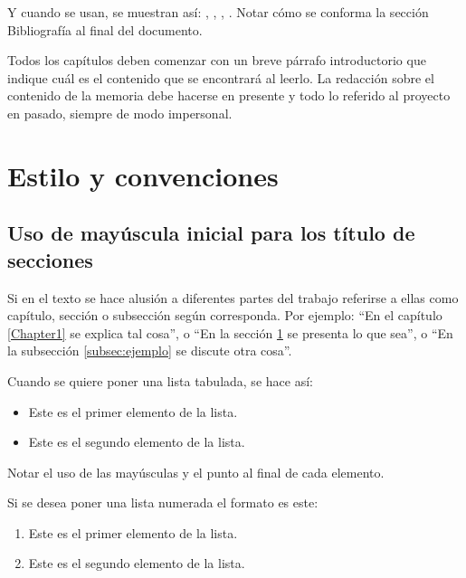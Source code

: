 Y cuando se usan, se muestran así: \citep{ARTICLE:1}, \citep{BOOK:1}, \citep{BOOK:2}, \citep{WEBSITE:1}.  Notar cómo se conforma la sección Bibliografía al final del documento. 



Todos los capítulos deben comenzar con un breve párrafo introductorio que indique cuál es el contenido que se encontrará al leerlo.  La redacción sobre el contenido de la memoria debe hacerse en presente y todo lo referido al proyecto en pasado, siempre de modo impersonal.

\section{Estilo y convenciones}
\label{sec:ejemplo}

\subsection{Uso de mayúscula inicial para los título de secciones}

Si en el texto se hace alusión a diferentes partes del trabajo referirse a ellas como capítulo, sección o subsección según corresponda. Por ejemplo: ``En el capítulo \ref{Chapter1} se explica tal cosa'', o ``En la sección \ref{sec:ejemplo} se presenta lo que sea'', o ``En la subsección \ref{subsec:ejemplo} se discute otra cosa''.

Cuando se quiere poner una lista tabulada, se hace así:

\begin{itemize}
	\item Este es el primer elemento de la lista.
	\item Este es el segundo elemento de la lista.
\end{itemize}

Notar el uso de las mayúsculas y el punto al final de cada elemento.

Si se desea poner una lista numerada el formato es este:

\begin{enumerate}
	\item Este es el primer elemento de la lista.
	\item Este es el segundo elemento de la lista.
\end{enumerate}

